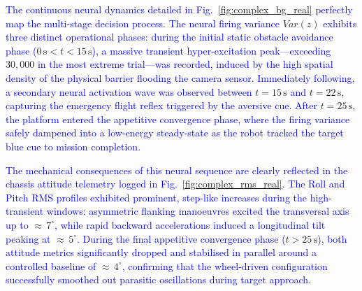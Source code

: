 \documentclass[preprint,12pt]{elsarticle}
\newcommand{\revblue}[1]{\textcolor{blue}{#1}}
\begin{document}
\revblue{The continuous neural dynamics detailed in Fig.~}\ref{fig:complex_bg_real}\revblue{ perfectly map the multi-stage decision process. The neural firing variance }$Var(z)$\revblue{ exhibits three distinct operational phases: during the initial static obstacle avoidance phase (}$0\,\text{s} < t < 15\,\text{s}$\revblue{), a massive transient hyper-excitation peak---exceeding }$30{,}000$\revblue{ in the most extreme trial---was recorded, induced by the high spatial density of the physical barrier flooding the camera sensor. Immediately following, a secondary neural activation wave was observed between }$t = 15\,\text{s}$\revblue{ and }$t = 22\,\text{s}$\revblue{, capturing the emergency flight reflex triggered by the aversive cue. After }$t = 25\,\text{s}$\revblue{, the platform entered the appetitive convergence phase, where the firing variance safely dampened into a low-energy steady-state as the robot tracked the target blue cue to mission completion.}

\revblue{The mechanical consequences of this neural sequence are clearly reflected in the chassis attitude telemetry logged in Fig.~}\ref{fig:complex_rms_real}\revblue{. The Roll and Pitch RMS profiles exhibited prominent, step-like increases during the high-transient windows: asymmetric flanking manoeuvres excited the transversal axis up to }${\approx}\,7^{\circ}$\revblue{, while rapid backward accelerations induced a longitudinal tilt peaking at }${\approx}\,5^{\circ}$\revblue{. During the final appetitive convergence phase (}$t > 25\,\text{s}$\revblue{), both attitude metrics significantly dropped and stabilised in parallel around a controlled baseline of }${\approx}\,4^{\circ}$\revblue{, confirming that the wheel-driven configuration successfully smoothed out parasitic oscillations during target approach.}

\end{document}
